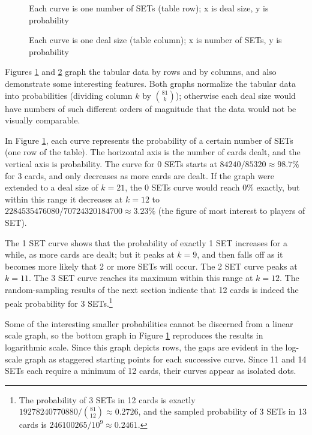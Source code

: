 \documentclass[10pt]{amsart}
\newcommand{\SET}{SET\texttrademark}  %
\begin{document}
\begin{figure}[!htb]
  \caption{\label{FIGROWS} Each curve is one number of SETs (table row); x is
    deal size, y is probability}
\end{figure}

\begin{figure}[!htb]
  \caption{\label{FIGCOLS} Each curve is one deal size (table column); x is
    number of SETs, y is probability}
\end{figure}

Figures \ref{FIGROWS} and \ref{FIGCOLS} graph the tabular data by rows and by
columns, and also demonstrate some interesting features. Both graphs normalize
the tabular data into probabilities (dividing column $k$ by $\binom{81}{k}$);
otherwise each deal size would have numbers of such different orders of
magnitude that the data would not be visually comparable.

In Figure \ref{FIGROWS}, each curve represents the probability of a certain
number of SETs (one row of the table). The horizontal axis is the number of
cards dealt, and the vertical axis is probability. The curve for 0 SETs starts
at $84240/85320\approx 98.7\%$ for 3 cards, and only decreases as more cards are
dealt. If the graph were extended to a deal size of $k=21$, the 0 SETs curve
would reach $0\%$ exactly, but within this range it decreases at $k=12$ to
$2284535476080/70724320184700\approx 3.23\%$ (the figure of most interest to
players of \SET).

The 1 SET curve shows that the probability of exactly 1 SET increases for a
while, as more cards are dealt; but it peaks at $k=9$, and then falls off as it
becomes more likely that 2 or more SETs will occur. The 2 SET curve peaks at
$k=11$. The 3 SET curve reaches its maximum within this range at $k=12$. The
random-sampling results of the next section indicate that 12 cards is indeed the
peak probability for 3 SETs.\footnote{The probability of 3 SETs in 12 cards is
  exactly $19278240770880/\binom{81}{12}\approx 0.2726$, and the sampled
  probability of 3 SETs in 13 cards is $246100265/10^9\approx 0.2461$.}

Some of the interesting smaller probabilities cannot be discerned from a linear
scale graph, so the bottom graph in Figure \ref{FIGROWS} reproduces the results
in logarithmic scale. Since this graph depicts rows, the gaps are evident in the
log-scale graph as staggered starting points for each successive curve. Since 11
and 14 SETs each require a minimum of 12 cards, their curves appear as isolated
dots.
\end{document}
